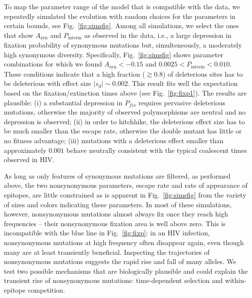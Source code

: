 \documentclass[rmp, twocolumn]{revtex4}
\newcommand{\pfix}{P_{fix}}
\newcommand{\FIG}[1]{Fig.~\ref{fig:#1}}
\begin{document}
To map the parameter range of the model that is compatible with the data, we
repeatedly simulated the evolution with random choices for the parameters in
certain bounds, see \FIG{simsfig}.
Among all simulations, we select the ones that show $A_\text{syn}$ and
$P_\text{interm}$ as observed in the data, i.e., a large depression in fixation
probability of synonymous mutations but, simulteneously, a moderately high
synonymous diversity. Specifically, \FIG{simsfig} shows parameter combinations
for which we found $A_\text{syn} < -0.15$ and $0.0025 < P_\text{interm} <
0.010$. These conditions indicate that a high fraction ($\gtrsim 0.8$) of
deleterious sites has to be deleterious with effect size $|s_d| \sim 0.002$. 
This result fits well the expectation based on the fixation/extinction times above (see \FIG{fixp1}).
The results are plausible:
(i) a substantial depression in $\pfix$ requires pervasive deleterious
mutations, otherwise the majority of observed polymorphisms are neutral and no
depression is observed; (ii) in order to hitchhike, the deleterious effect size
has to be much smaller than the escape rate, otherwise the double mutant has
little or no fitness advantage; (iii) mutations with a deleterious effect
smaller than approximately $0.001$ behave neutrally consistent with the typical
coalescent times observed in HIV.

As long as only features of synonymous mutations are filtered, as performed
above, the two nonsynonymous parameters, escape rate
and rate of appearance of epitopes, are little constrained as is apparent in
\FIG{simsfig} from the variety of sizes and colors indicating these parameters.
In most of these simulations, however, nonsynonymous mutations almost always fix once they reach high frequencies
-- their nonsynonymous fixation area is well above zero. This is incompatible
with the blue line in \FIG{fixp}: in an HIV infection, nonsynonymous
mutations at high frequency often disappear again, even though many are at
least transiently beneficial. Inspecting the trajectories of nonsynonymous
mutations suggests the rapid rise and fall of many alleles. We test two possible
mechanisms that are biologically plausible and could explain the transient rise
of nonsynonymous mutations: time-dependent selection and within-epitope
competition.
\end{document}
